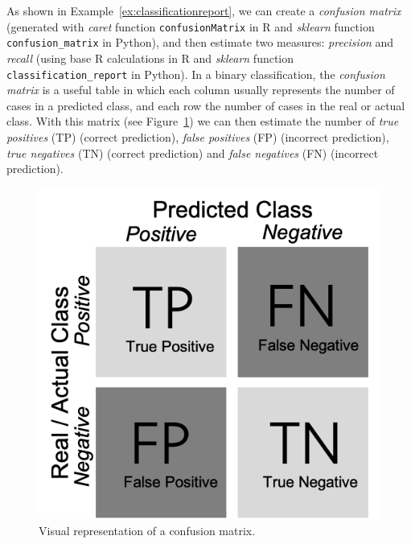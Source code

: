 
As shown in Example~\ref{ex:classificationreport}, we can create a \emph{confusion matrix} (generated with \emph{caret} function \texttt{confusionMatrix} in R and \emph{sklearn} function \texttt{confusion\_matrix} in Python), and then estimate two measures: \emph{precision} and \emph{recall} (using base R calculations in R and \emph{sklearn} function \texttt{classification\_report} in Python). In a binary classification, the \emph{confusion matrix} is a useful table in which each column usually represents the number of cases in a predicted class, and each row the number of cases in the real or actual class. With this matrix (see Figure~\ref{fig:matrix}) we can then estimate the number of \emph{true positives} (TP) (correct prediction), \emph{false positives} (FP) (incorrect prediction), \emph{true negatives} (TN) (correct prediction) and \emph{false negatives} (FN) (incorrect prediction).


\begin{figure}
\centering
\includegraphics[width=\linewidth]{figures/ch09_matrix.png}
\caption{Visual representation of a confusion matrix.}
\label{fig:matrix}
\end{figure}

